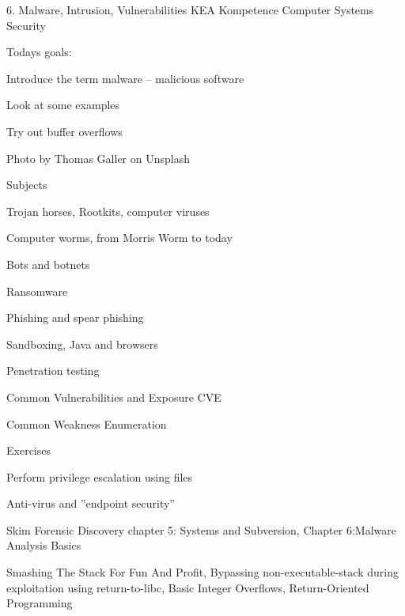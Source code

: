 \documentclass[Screen16to9,17pt]{foils}
\begin{document}
\mytitlepage
{6. Malware, Intrusion, Vulnerabilities}
{KEA Kompetence Computer Systems Security \the\year}



Todays goals:
\begin{list2}
\item Introduce the term malware -- malicious software
\item Look at some examples
\item Try out buffer overflows
\end{list2}

{\small Photo by Thomas Galler on Unsplash}


\begin{list1}
\item Subjects
\begin{list2}
  \item Trojan horses, Rootkits, computer viruses
  \item Computer worms, from Morris Worm to today
  \item Bots and botnets
  \item Ransomware
  \item Phishing and spear phishing
  \item Sandboxing, Java and browsers
  \item Penetration testing
  \item Common Vulnerabilities and Exposure CVE
  \item Common Weakness Enumeration
\end{list2}
\item Exercises
\begin{list2}
\item Perform privilege escalation using files
\item Anti-virus and ”endpoint security”
\end{list2}
\end{list1}




\begin{list1}
\item Skim Forensic Discovery chapter 5: Systems and Subversion, Chapter 6:Malware Analysis Basics
\item Smashing The Stack For Fun And Profit, Bypassing non-executable-stack during exploitation using return-to-libc, Basic Integer Overflows, Return-Oriented Programming

\end{list1}
\end{document}
